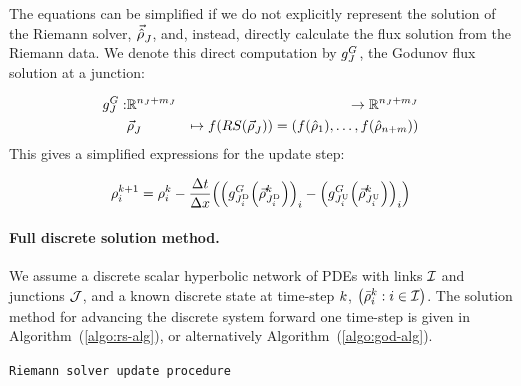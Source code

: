 						The equations can be simplified if we do not explicitly represent
						the solution of the Riemann solver, $\vec{\hat{\rho}}_{J}^{}$, and, instead,
						directly calculate the flux solution from the Riemann data. We denote
						this direct computation by $g^{G}_{J}$, the Godunov flux solution
						at a junction:
						
						\begin{eqnarray}
							\god_{\jn}: & \mathbb{R}^{\ninc_{\jn}+\nout_{\jn}} & \rightarrow\mathbb{R}^{\ninc_{\jn}+\nout_{\jn}}\nonumber \\
							& \juncstate{\jn}{} & \mapsto f\left(RS\left(\juncstate{\jn}{}\right)\right)=\left(f\left(\trace{\dvar}_{1}\right),\ldots,f\left(\trace{\dvar}_{\ninc+\nout}\right)\right)\label{eq:god-jn}
						\end{eqnarray}
						This gives a simplified expressions for the update step:
						
						\begin{equation}
							\discrete{\link}{\tind+1}=\discrete{\link}{\tind}-\dfrac{\Delta t}{\Delta x}\left(\left(\god_{\jdown{\link}}\left(\juncstate{\jdown{\link}}{\tind}\right)\right)_{\link}-\left(\god_{\jup{\link}}\left(\juncstate{\jup{\link}}{\tind}\right)\right)_{\link}\right)\label{eq:composed-flux}
						\end{equation}
						
						
						
						\paragraph{Full discrete solution method.\label{par:Full-solution-method}}
						
						We assume a discrete scalar hyperbolic network of PDEs with links
						$\mathcal{I}$ and junctions $\mathcal{J}$, and a known discrete state at time-step
						$k$, $\left(\initdiscrete_{\link}^{\tind}:\link\in\links\right)$.
						The solution method for advancing the discrete system forward one
						time-step is given in Algorithm~(\ref{algo:rs-alg}), or alternatively
						Algorithm~(\ref{algo:god-alg}).
						
						\begin{algorithm}[H]
							\caption{\texttt{Riemann solver update procedure}}
							
							
							
						\end{algorithm}
						
